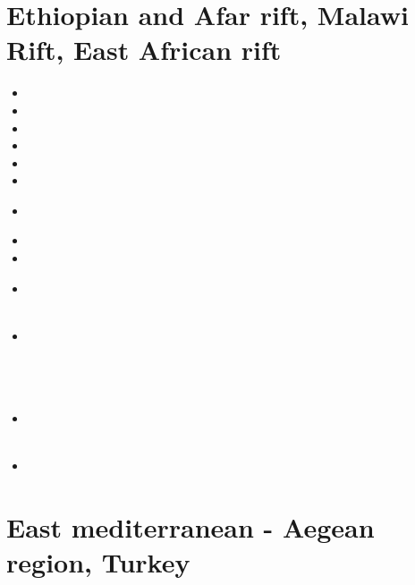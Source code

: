 \section{Ethiopian and Afar rift, Malawi Rift, East African rift} 

\begin{scriptsize}
\begin{itemize}
\item[\twothousandfive] 
\item[\twothousandseven] 
\item[\twothousandeight] 
\item[\twothousandnine] 
\item[\twothousandten] 
\item[\twothousandthirteen] 
\item[\twothousandfourteen] 
\\ 
\item[\twothousandfifteen] 
\item[\twothousandseventeen] 
\item[\twothousandnineteen] 
 \\
 \\
\item[\twothousandtwenty] 
 \\
 \\
 \\
 \\
\item[\twothousandtwentyone] 
 \\
 \\
\item[\twothousandtwentytwo] 
 \\
\end{itemize}
\end{scriptsize}

\section{East mediterranean - Aegean region, Turkey} 

